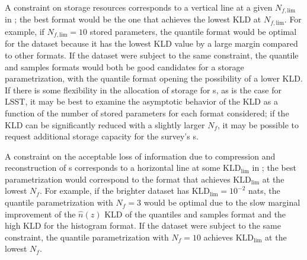 A constraint on storage resources corresponds to a vertical line at a given 
$N_{f, \mathrm{lim}}$ in ; the best format would be the one 
that achieves the lowest KLD at $N_{f, \mathrm{lim}}$.
For example, if $N_{f, \mathrm{lim}}=10$ stored parameters, the quantile format 
would be optimal for the \mgdata dataset because it has the lowest KLD value by 
a large margin compared to other formats.
If the \ssdata dataset were subject to the same constraint, the quantile and 
samples formats would both be good candidates for a storage parametrization, 
with the quantile format opening the possibility of a lower KLD.
If there is some flexibility in the allocation of storage for \pz s, as is the 
case for LSST, it may be best to examine the asymptotic behavior of the KLD as 
a function of the number of stored parameters for each format considered; if 
the KLD can be significantly reduced with a slightly larger $N_{f}$, it may be 
possible to request additional storage capacity for the survey's \pz s.

A constraint on the acceptable loss of information due to compression and 
reconstruction of \pz s corresponds to a horizontal line at some 
$\mathrm{KLD}_{\mathrm{lim}}$ in ; the best parametrization 
would correspond to the format that achieves $\mathrm{KLD}_{\mathrm{lim}}$ at 
the lowest $N_{f}$.
For example, if the brighter dataset has $\mathrm{KLD}_{\mathrm{lim}}=10^{-2}$ 
nats, the quantile parametrization with $N_{f}=3$ would be optimal due to the 
slow marginal improvement of the $\hat{n}(z)$ KLD of the quantiles and samples 
format and the high KLD for the histogram format.
If the \ssdata dataset were subject to the same constraint, the quantile 
parametrization with $N_{f}=10$ achieves $\mathrm{KLD}_{\mathrm{lim}}$ at the 
lowest $N_{f}$.



